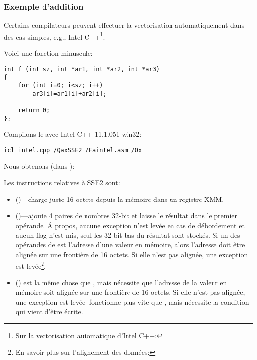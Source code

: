 \subsubsection{Exemple d'addition}


Certains compilateurs peuvent effectuer la vectorisation automatiquement dans des
cas simples, e.g., Intel C++\footnote{Sur la vectorisation automatique d'Intel C++:
\URLINTELVEC}.

Voici une fonction minuscule:

\begin{lstlisting}[style=customc]
int f (int sz, int *ar1, int *ar2, int *ar3)
{
	for (int i=0; i<sz; i++)
		ar3[i]=ar1[i]+ar2[i];

	return 0;
};
\end{lstlisting}


Compilons le avec Intel C++ 11.1.051 win32:

\begin{verbatim}
icl intel.cpp /QaxSSE2 /Faintel.asm /Ox
\end{verbatim}

Nous obtenons (dans \IDA):



Les instructions relatives à SSE2 sont:
\begin{itemize}
\item
\MOVDQU ()---charge juste 16 octets depuis la
mémoire dans un registre XMM.

\item
\PADDD ()---ajoute 4 paires de nombres 32-bit et laisse le
résultat dans le premier opérande.
Á propos, aucune exception n'est levée en cas de débordement et aucun flag n'est mis,
seul les 32-bit bas du résultat sont stockés.
Si un des opérandes de \PADDD est l'adresse d'une valeur en mémoire, alors l'adresse
doit être alignée sur une frontière de 16 octets.
Si elle n'est pas alignée, une exception est levée\footnote{En savoir plus sur l'alignement
des données: \URLWPDA}.

\item
\MOVDQA () est la même chose que \MOVDQU, mais nécessite
que l'adresse de la valeur en mémoire soit alignée sur une frontière de 16 octets.
Si elle n'est pas alignée, une exception est levée.
\MOVDQA fonctionne plus vite que \MOVDQU, mais nécessite la condition qui vient d'être
écrite.

\end{itemize}

